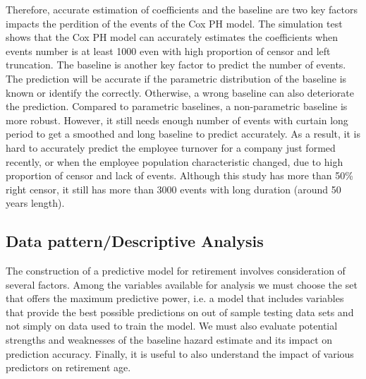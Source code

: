 \documentclass[12pt,letterpaper]{article}
\begin{document}
Therefore, accurate estimation of coefficients and the baseline are two key factors impacts the perdition of the events of the Cox PH model. The simulation test shows that the Cox PH model can accurately estimates the coefficients when events number is at least 1000 even with high proportion of censor and left truncation. The baseline is another key factor to predict the number of events. The prediction will be accurate if the parametric distribution of the baseline is known or identify the correctly. Otherwise, a wrong baseline can also deteriorate the prediction. Compared to parametric baselines, a non-parametric baseline is more robust. However, it still needs enough number of events with curtain long period to get a smoothed and long baseline to predict accurately. As a result, it is hard to accurately predict the employee turnover for a company just formed recently, or when the employee population characteristic changed, due to high proportion of censor and lack of events. Although this study has more than 50\% right censor, it still has more than 3000 events with long duration (around 50 years length).






%




\subsection{Data pattern/Descriptive Analysis}

The construction of a predictive model for retirement involves consideration of several factors. Among the variables available for analysis we must choose the set that offers the maximum predictive power, i.e. a model that includes variables that provide the best possible predictions on out of sample testing data sets and not simply on data used to train the model.  We must also evaluate potential strengths and weaknesses of the baseline hazard estimate and its impact on prediction accuracy.  Finally, it is useful to also understand the impact of various predictors on retirement age.
\end{document}

